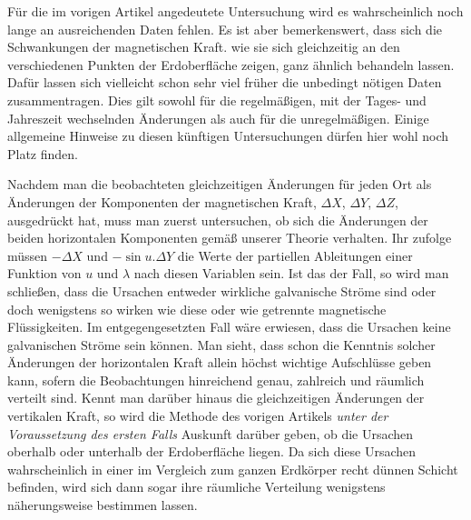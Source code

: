 Für die im vorigen Artikel angedeutete Untersuchung wird es wahrscheinlich noch lange an ausreichenden Daten fehlen. Es ist aber bemerkenswert, dass sich die Schwankungen der magnetischen Kraft. wie sie sich gleichzeitig an den verschiedenen Punkten der Erdoberfläche zeigen, ganz ähnlich behandeln lassen. Dafür lassen sich vielleicht schon sehr viel früher die unbedingt nötigen Daten zusammentragen. Dies gilt sowohl für die regelmäßigen, mit der Tages- und Jahreszeit wechselnden Änderungen als auch für die unregelmäßigen. Einige allgemeine Hinweise zu diesen künftigen Untersuchungen dürfen hier wohl noch Platz finden.

Nachdem man die beobachteten gleichzeitigen Änderungen für jeden Ort als Änderungen der Komponenten der magnetischen Kraft, $\Delta X$, $\Delta Y$, $\Delta Z$, ausgedrückt hat, muss man zuerst untersuchen, ob sich die Änderungen der beiden horizontalen Komponenten gemäß unserer Theorie verhalten. Ihr zufolge müssen $-\Delta X$ und $-\sin u.\Delta Y$ die Werte der partiellen Ableitungen einer Funktion von $u$ und $\lambda$ nach diesen Variablen sein. Ist das der Fall, so wird man schließen, dass die Ursachen entweder wirkliche galvanische Ströme sind oder doch wenigstens so wirken wie diese oder wie getrennte magnetische Flüssigkeiten. Im entgegengesetzten Fall wäre erwiesen, dass die Ursachen keine galvanischen Ströme sein können. Man sieht, dass schon die Kenntnis solcher Änderungen der horizontalen Kraft allein höchst wichtige Aufschlüsse geben kann, sofern die Beobachtungen hinreichend genau, zahlreich und räumlich verteilt sind. Kennt man darüber hinaus die gleichzeitigen Änderungen der vertikalen Kraft, so wird die Methode des vorigen Artikels \textit{unter der Voraussetzung des ersten Falls} Auskunft darüber geben, ob die Ursachen oberhalb oder unterhalb der Erdoberfläche liegen. Da sich diese Ursachen wahrscheinlich in einer im Vergleich zum ganzen Erdkörper recht dünnen Schicht befinden, wird sich dann sogar ihre räumliche Verteilung wenigstens näherungsweise bestimmen lassen.

